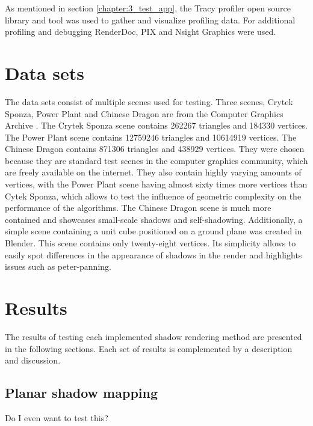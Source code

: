 As mentioned in section \ref{chapter:3_test_app}, the Tracy profiler open source library and tool was used to gather and visualize profiling data. For additional profiling and debugging RenderDoc, PIX and Nsight Graphics were used.

\section{Data sets}
The data sets consist of multiple scenes used for testing. Three scenes, Crytek Sponza, Power Plant and Chinese Dragon are from the Computer Graphics Archive \cite{bib:internet:test_scenes}. The Crytek Sponza scene contains 262267 triangles and 184330 vertices. The Power Plant scene contains 12759246 triangles and 10614919 vertices. The Chinese Dragon contains 871306 triangles and 438929 vertices. They were chosen because they are standard test scenes in the computer graphics community, which are freely available on the internet. They also contain highly varying amounts of vertices, with the Power Plant scene having almost sixty times more vertices than Cytek Sponza, which allows to test the influence of geometric complexity on the performance of the algorithms. The Chinese Dragon scene is much more contained and showcases small-scale shadows and self-shadowing. Additionally, a simple scene containing a unit cube positioned on a ground plane was created in Blender. This scene contains only twenty-eight vertices. Its simplicity allows to easily spot differences in the appearance of shadows in the render and highlights issues such as peter-panning.

\section{Results}

The results of testing each implemented shadow rendering method are presented in the following sections. Each set of results is complemented by a description and discussion.

\subsection{Planar shadow mapping}
Do I even want to test this?


